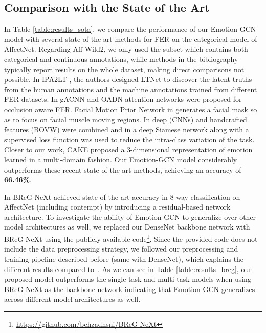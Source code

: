 \documentclass[a4paper, 10pt, conference]{ieeeconf}      \usepackage{FG2021}
\begin{document}
\subsection{Comparison with the State of the Art}
In Table \ref{table:results_sota}, we compare the performance of our Emotion-GCN model with several state-of-the-art methods for FER on the categorical model of AffectNet. Regarding Aff-Wild2, we only used the subset which contains both categorical and continuous annotations, while methods in the bibliography typically report results on the whole dataset, making direct comparisons not possible. In IPA2LT \cite{zeng2018facial}, the authors designed LTNet to discover the latent truths from the human annotations and the machine annotations trained from different FER datasets. In gACNN \cite{li2018occlusion} and OADN \cite{ding2020occlusion} attention networks were proposed for occlusion aware FER. Facial Motion Prior Network in \cite{chen2019facial} generates a facial mask so as to focus on facial muscle moving regions. In \cite{georgescu2019local} deep (CNNs) and handcrafted features (BOVW) were combined and in \cite{hayale2019facial} a deep Siamese network along with a supervised loss function was used to reduce the intra-class variation of the task. Closer to our work, CAKE \cite{kervadec2018cake} proposed a 3-dimensional representation of emotion learned in a multi-domain fashion. Our Emotion-GCN model considerably outperforms these recent state-of-the-art methods, achieving an accuracy of \textbf{66.46\%}. 

In \cite{hasani2020breg} BReG-NeXt achieved state-of-the-art accuracy in 8-way classification on AffectNet (including contempt) by introducing a residual-based network architecture. To investigate the ability of Emotion-GCN to generalize over other model architectures as well, we replaced our DenseNet backbone network with BReG-NeXt using the publicly available code\footnote{\url{https://github.com/behzadhsni/BReG-NeXt}}. Since the provided code does not include the data preprocessing strategy, we followed our preprocessing and training pipeline described before (same with DenseNet), which explains the different results compared to~\cite{hasani2020breg}. As we can see in Table \ref{table:results_breg}, our proposed model outperforms the single-task and multi-task models when using BReG-NeXt as the backbone network indicating that Emotion-GCN generalizes across different model architectures as well.
\end{document}
